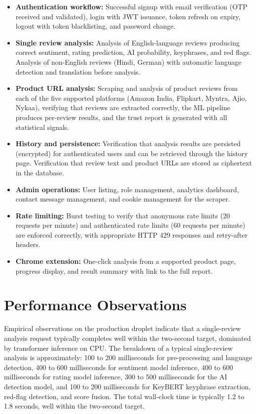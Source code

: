 \documentclass[12pt,a4paper,oneside]{report}
\begin{document}
\begin{itemize}[leftmargin=*]
  \item \textbf{Authentication workflow:} Successful signup with email
        verification (OTP received and validated), login with JWT
        issuance, token refresh on expiry, logout with token blacklisting,
        and password change.
  \item \textbf{Single review analysis:} Analysis of English-language
        reviews producing correct sentiment, rating prediction, AI
        probability, keyphrases, and red flags. Analysis of
        non-English reviews (Hindi, German) with automatic language
        detection and translation before analysis.
  \item \textbf{Product URL analysis:} Scraping and analysis of product
        reviews from each of the five supported platforms (Amazon India,
        Flipkart, Myntra, Ajio, Nykaa), verifying that reviews are
        extracted correctly, the ML pipeline produces per-review results,
        and the trust report is generated with all statistical signals.
  \item \textbf{History and persistence:} Verification that analysis
        results are persisted (encrypted) for authenticated users and
        can be retrieved through the history page. Verification that
        review text and product URLs are stored as ciphertext in the
        database.
  \item \textbf{Admin operations:} User listing, role management,
        analytics dashboard, contact message management, and cookie
        management for the scraper.
  \item \textbf{Rate limiting:} Burst testing to verify that anonymous
        rate limits (20 requests per minute) and authenticated rate limits
        (60 requests per minute) are enforced correctly, with appropriate
        HTTP 429 responses and retry-after headers.
  \item \textbf{Chrome extension:} One-click analysis from a supported
        product page, progress display, and result summary with link to
        the full report.
\end{itemize}

\section{Performance Observations}
Empirical observations on the production droplet indicate that a
single-review analysis request typically completes well within the
two-second target, dominated by transformer inference on CPU. The
breakdown of a typical single-review analysis is approximately:
100 to 200 milliseconds for pre-processing and language detection,
400 to 600 milliseconds for sentiment model inference, 400 to 600
milliseconds for rating model inference, 300 to 500 milliseconds for
the AI detection model, and 100 to 200 milliseconds for KeyBERT
keyphrase extraction, red-flag detection, and score fusion. The total
wall-clock time is typically 1.2 to 1.8 seconds, well within the
two-second target.
\end{document}
